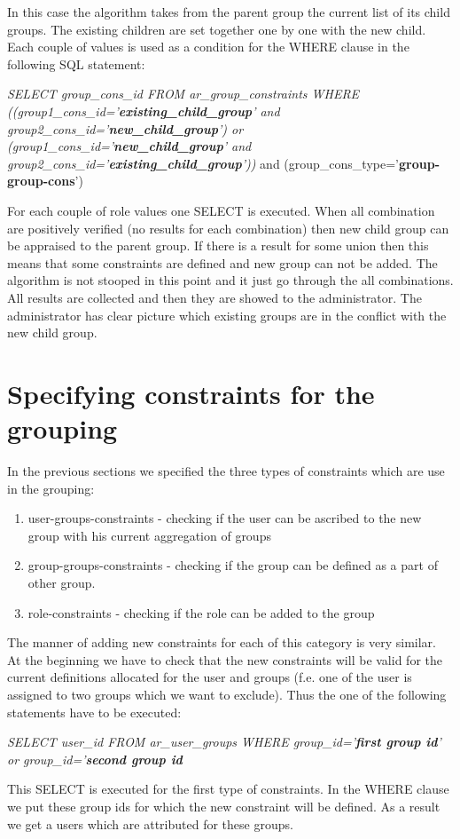 In this case the algorithm takes from the parent group the current list of its child groups. The existing children are set together one by one with the new child. Each couple of values is used as a condition for the WHERE clause in the following SQL statement:
\begin{center}\emph{SELECT group\_cons\_id FROM ar\_group\_constraints WHERE
((group1\_cons\_id='}\textbf{\emph{existing\_child\_group}}\emph{' and group2\_cons\_id='}\textbf{\emph{new\_child\_group}}\emph{') or (group1\_cons\_id='}\textbf{\emph{new\_child\_group}}\emph{' and group2\_cons\_id='}\textbf{\emph{existing\_child\_group}}\emph{'))} and (group\_cons\_type='\textbf{group-group-cons}')\end{center}

For each couple of role values one SELECT is executed. When all combination are positively verified (no results for each combination) then new child group can be appraised to the parent group. If there is a result for some union then this means that some constraints are defined and new group can not be added. The algorithm is not stooped in this point and it just go through the all combinations. All results are collected and then they are showed to the administrator. The administrator has clear picture which existing groups are in the conflict with the new child group.\\

\section{Specifying constraints for the grouping\label{definingconstraints}} 
In the previous sections we specified the three types of constraints which are use in the grouping:
\begin{enumerate}
\item user-groups-constraints - checking if the user can be ascribed to the new group with his current aggregation of groups
\item group-groups-constraints - checking if the group can be defined as a part of other group.
\item role-constraints - checking if the role can be added to the group
\end{enumerate}
The manner of adding new constraints for each of this category is very similar. At the beginning we have to check that the new constraints will be valid for the current definitions allocated for the user and groups (f.e. one of the user is assigned to two groups which we want to exclude). Thus the one of the following statements have to be executed:\\
\begin{center}
\emph{SELECT user\_id FROM ar\_user\_groups WHERE
group\_id='}\textbf{\emph{first group id}}\emph{' or group\_id='}\textbf{\emph{second group id}}
\end{center}
This SELECT is executed for the first type of constraints. In the WHERE clause we put these group ids for which the new constraint will be defined. As a result we get a users which are attributed for these groups.\\ 

